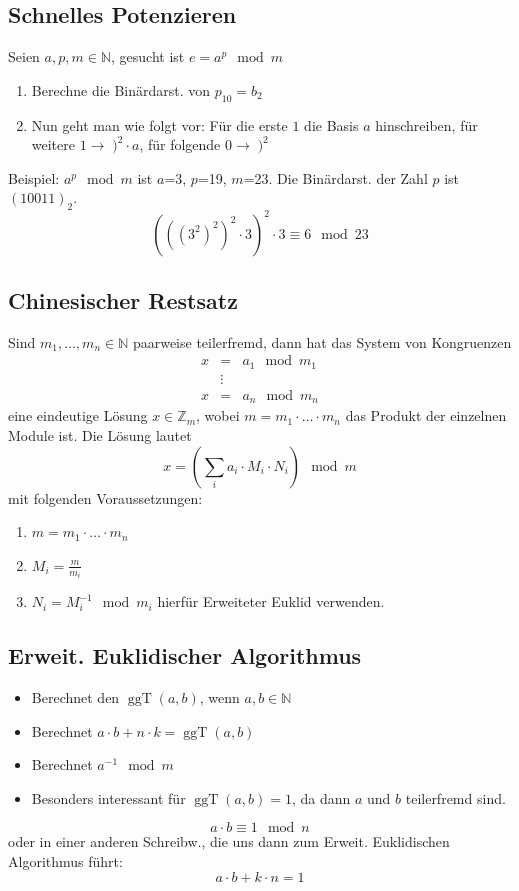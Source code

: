 \documentclass[8pt,a4paper,landscape]{article}
\begin{document}
\begin{multicols}{4}
\subsection{Schnelles Potenzieren}
Seien \(a,{}p,{}m \in \mathbb{N}\), gesucht ist \(e=a^{p} \mod m\)
\begin{enumerate}
\item Berechne die Binärdarst. von \(p_{10} = b_2\)
\item Nun geht man wie folgt vor: Für die erste $1$ die Basis $a$ hinschreiben, für weitere \(1 \rightarrow \; )^2 \cdot a\), für folgende \(0 \rightarrow \; )^2\)
\end{enumerate}
Beispiel: $a^{p} \mod m$ ist $a$=3, $p$=19, $m$=23. Die Binärdarst. der Zahl $p$ ist \((10011)_{2}\). %
\[(((3^2)^2)^2 \cdot 3)^2 \cdot 3 \equiv 6 \mod23\] 

\subsection{Chinesischer Restsatz}
Sind \(m_{1}, \dots, m_{n} \in \mathbb{N}\) paarweise teilerfremd, dann hat das System von Kongruenzen 
\begin{eqnarray}
x &=& a_{1} \mod m_{1} \nonumber\\
&\vdots & \nonumber \\
x &=& a_{n} \mod m_{n} \nonumber
\end{eqnarray}
eine eindeutige Lösung \(x \in \mathbb{Z}_{m}\), wobei \(m=m_{1} \cdot \dots \cdot m_{n}\) das Produkt der einzelnen Module ist.
Die Lösung lautet 
\[
    x = \left( \sum_{i} a_{i} \cdot M_{i} \cdot N_{i} \right) \mod m
\]
mit folgenden Voraussetzungen:
\begin{enumerate}
\item \(m=m_{1} \cdot \dots \cdot m_{n}\)  
\item \(M_{i} = \frac{m}{m_{i}}\)
\item \( N_{i} = M_{i}^{-1} \mod m_i\) hierfür Erweiteter Euklid verwenden. \end{enumerate}


\subsection{Erweit. Euklidischer Algorithmus}
\begin{itemize}
\item Berechnet den \(\operatorname{ggT}(a,{}b)\), wenn $a,b \in \mathbb{N}$
\item Berechnet \(a \cdot b + n \cdot k = \operatorname{ggT}(a,{}b)\)
\item Berechnet \(a^{-1} \mod m\)
\item Besonders interessant für \(\operatorname{ggT}(a,{}b)=1\), da dann \(a\) und \(b\) teilerfremd sind.
\end{itemize}
\[a \cdot b \equiv 1 \mod n\]
oder in einer anderen Schreibw., die uns dann zum Erweit. Euklidischen Algorithmus führt:
\[a \cdot b + k \cdot n = 1\]

\end{multicols}
\end{document}
